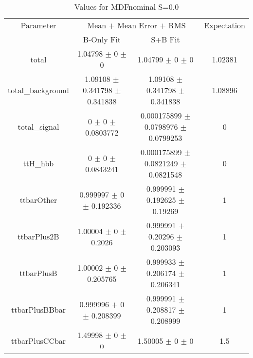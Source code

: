 \begin{table}
\centering
\caption{Values for MDFnominal S=0.0}
\begin{tabular}{cccc}
\toprule
Parameter & \multicolumn{2}{c}{Mean $\pm$ Mean Error $\pm$ RMS} & Expectation\\
 & B-Only Fit & S+B Fit & \\
\midrule
total & \num{1.04798} $\pm$ \num{0} $\pm$ \num{0} & \num{1.04799} $\pm$ \num{0} $\pm$ \num{0} & \num{1.02381}\\
total\_background & \num{1.09108} $\pm$ \num{0.341798} $\pm$ \num{0.341838} & \num{1.09108} $\pm$ \num{0.341798} $\pm$ \num{0.341838} & \num{1.08896}\\
total\_signal & \num{0} $\pm$ \num{0} $\pm$ \num{0.0803772} & \num{0.000175899} $\pm$ \num{0.0798976} $\pm$ \num{0.0799253} & \num{0}\\
ttH\_hbb & \num{0} $\pm$ \num{0} $\pm$ \num{0.0843241} & \num{0.000175899} $\pm$ \num{0.0821249} $\pm$ \num{0.0821548} & \num{0}\\
ttbarOther & \num{0.999997} $\pm$ \num{0} $\pm$ \num{0.192336} & \num{0.999991} $\pm$ \num{0.192625} $\pm$ \num{0.19269} & \num{1}\\
ttbarPlus2B & \num{1.00004} $\pm$ \num{0} $\pm$ \num{0.2026} & \num{0.999991} $\pm$ \num{0.20296} $\pm$ \num{0.203093} & \num{1}\\
ttbarPlusB & \num{1.00002} $\pm$ \num{0} $\pm$ \num{0.205765} & \num{0.999933} $\pm$ \num{0.206174} $\pm$ \num{0.206341} & \num{1}\\
ttbarPlusBBbar & \num{0.999996} $\pm$ \num{0} $\pm$ \num{0.208399} & \num{0.999991} $\pm$ \num{0.208817} $\pm$ \num{0.208999} & \num{1}\\
ttbarPlusCCbar & \num{1.49998} $\pm$ \num{0} $\pm$ \num{0} & \num{1.50005} $\pm$ \num{0} $\pm$ \num{0} & \num{1.5}\\
\bottomrule
\end{tabular}
\end{table}